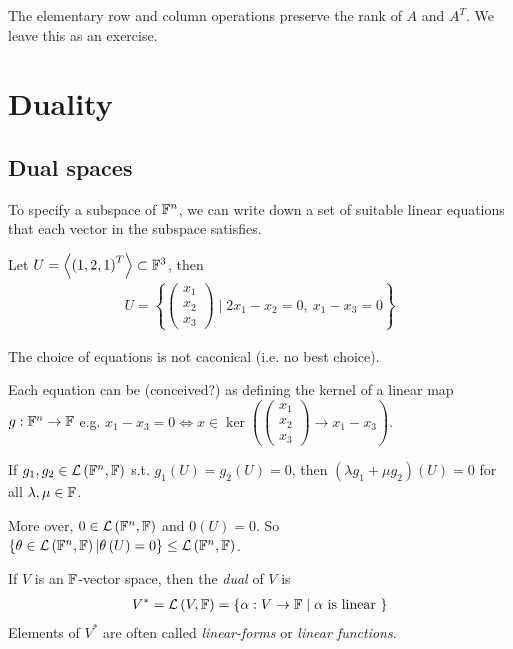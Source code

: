 \documentclass[a4paper]{article}
\begin{document}
The elementary row and column operations preserve the rank of $A$ and $A^T$. We leave this as an exercise.

\newpage

\section{Duality}

\subsection{Dual spaces}

To specify a subspace of $\mathbb{F}^n$, we can write down a set of suitable linear equations that each vector in the subspace satisfies.

\begin{eg}
Let $U = \left<\left(1,2,1\right)^T\right> \subset \mathbb{F}^3$, then
\begin{equation*}
\begin{aligned}
U = \left\{\left(\begin{matrix}
x_1\\
x_2\\
x_3
\end{matrix}
\right) \mid 2x_1-x_2= 0, \ x_1 - x_3 = 0\right\}
\end{aligned}
\end{equation*}
\end{eg}

The choice of equations is not caconical (i.e. no best choice).

Each equation can be (conceived?) as defining the kernel of a linear map $g:\mathbb{F}^n \to \mathbb{F}$ e.g. $x_1 - x_3 = 0 \iff x \in \ker\left(\left(\begin{matrix}
x_1\\
x_2\\
x_3
\end{matrix}\right)
\to x_1-x_3\right)$.

If $g_1,g_2 \in \mathcal{L}\left(\mathbb{F}^n,\mathbb{F}\right)$ s.t. $g_1\left(U\right) = g_2\left(U\right) = 0$, then $\left(\lambda g_1 + \mu g_2\right) \left(U\right) = 0$ for all $\lambda,\mu \in \mathbb{F}$.

More over, $0 \in \mathcal{L}\left(\mathbb{F}^n,\mathbb{F}\right)$ and $0\left(U\right) = 0$. So $\left\{\theta \in \mathcal{L}\left(\mathbb{F}^n,\mathbb{F}\right) | \theta\left(U\right) = 0 \right\} \leq \mathcal{L}\left(\mathbb{F}^n,\mathbb{F}\right)$.

\begin{defi}
If $V$ is an $\mathbb{F}$-vector space, then the \emph{dual} of $V$ is
\begin{equation*}
\begin{aligned}
V^* = \mathcal{L}\left(V,\mathbb{F}\right) = \left\{\alpha:V \to \mathbb{F} \mid \alpha \text{ is linear }\right\}
\end{aligned}
\end{equation*}
Elements of $V^*$ are often called \emph{linear-forms} or \emph{linear functions}.
\end{defi}
\end{document}
